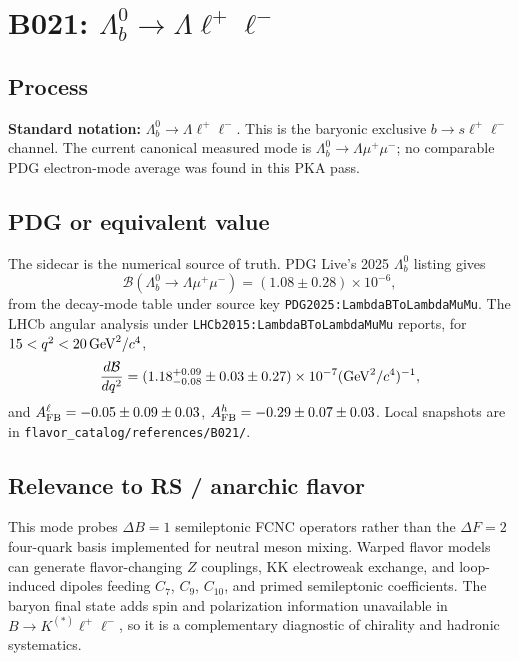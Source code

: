 
\section{B021: \(\Lambda_b^0\to\Lambda\ell^+\ell^-\)}

\subsection*{Process}
\textbf{Standard notation:} \(\Lambda_b^0\to\Lambda\ell^+\ell^-\).
This is the baryonic exclusive \(b\to s\ell^+\ell^-\) channel.  The current
canonical measured mode is \(\Lambda_b^0\to\Lambda\mu^+\mu^-\); no comparable
PDG electron-mode average was found in this PKA pass.

\subsection*{PDG or equivalent value}
The sidecar is the numerical source of truth.  PDG Live's 2025
\(\Lambda_b^0\) listing gives
\[
  \mathcal B(\Lambda_b^0\to\Lambda\mu^+\mu^-)
  =(1.08\pm0.28)\times10^{-6},
\]
from the decay-mode table under source key
\texttt{PDG2025:LambdaBToLambdaMuMu}.  The LHCb angular analysis under
\texttt{LHCb2015:LambdaBToLambdaMuMu} reports, for
\(15<q^2<20\,{\rm GeV}^2/c^4\),
\[
  \frac{d\mathcal B}{dq^2}
  =(1.18^{+0.09}_{-0.08}\pm0.03\pm0.27)\times10^{-7}
  ({\rm GeV}^2/c^4)^{-1},
\]
and \(A_{\rm FB}^{\ell}=-0.05\pm0.09\pm0.03\),
\(A_{\rm FB}^{h}=-0.29\pm0.07\pm0.03\).
Local snapshots are in \texttt{flavor\_catalog/references/B021/}.

\subsection*{Relevance to RS / anarchic flavor}
This mode probes \(\Delta B=1\) semileptonic FCNC operators rather than the
\(\Delta F=2\) four-quark basis implemented for neutral meson mixing.  Warped
flavor models can generate flavor-changing \(Z\) couplings, KK electroweak
exchange, and loop-induced dipoles feeding \(C_7\), \(C_9\), \(C_{10}\), and
primed semileptonic coefficients.  The baryon final state adds spin and
polarization information unavailable in \(B\to K^{(*)}\ell^+\ell^-\), so it is
a complementary diagnostic of chirality and hadronic systematics.

